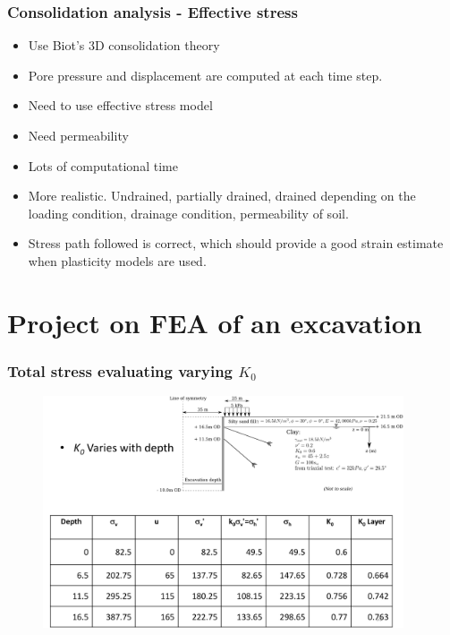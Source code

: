 \documentclass[notes]{beamer}
\begin{document}
\begin{frame}
\frametitle{Consolidation analysis - Effective stress}
\begin{itemize}
	\item Use Biot's 3D consolidation theory
	\item Pore pressure and displacement are computed at each time step.
	\item Need to use effective stress model
	\item Need permeability
	\item Lots of computational time
	\item More realistic. Undrained, partially drained, drained depending on the loading condition, drainage condition, permeability of soil.
	\item Stress path followed is correct, which should provide a good strain estimate when plasticity models are used.
\end{itemize}
\end{frame}

\section{Project on FEA of an excavation}
\begin{frame}
\frametitle{Total stress evaluating varying $K_0$}
\begin{figure}
	\includegraphics[width=0.95\textwidth]{figs/excavation-k0.png}
\end{figure}
\end{frame}
\end{document}
